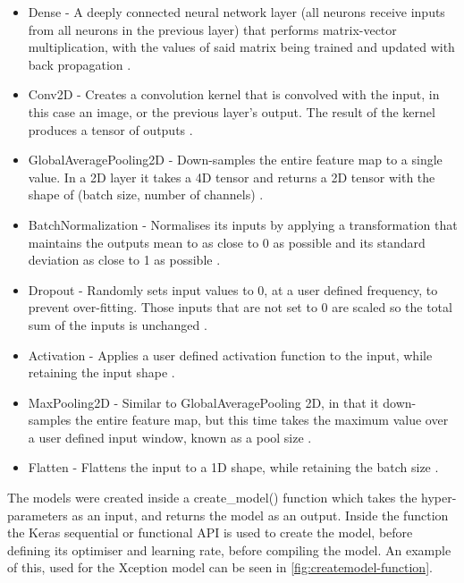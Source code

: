 \begin{itemize}
    \item Dense -  A deeply connected neural network layer (all neurons receive inputs from all neurons in the previous layer) that performs matrix-vector multiplication, with the values of said matrix being trained and updated with back propagation \citep{Denselay11:online}.
    \item Conv2D - Creates a convolution kernel that is convolved with the input, in this case an image, or the previous layer's output. The result of the kernel produces a tensor of outputs \citep{Conv2Dla69:online}.
    \item GlobalAveragePooling2D - Down-samples the entire feature map to a single value. In a 2D layer it takes a 4D tensor and returns a 2D tensor with the shape of (batch size, number of channels) \citep{GlobalAv91:online}.
    \item BatchNormalization - Normalises its inputs by applying a transformation that maintains the outputs mean to as close to 0 as possible and its standard deviation as close to 1 as possible \citep{BatchNor52:online}.
    \item Dropout - Randomly sets input values to 0, at a user defined frequency, to prevent over-fitting. Those inputs that are not set to 0 are scaled so the total sum of the inputs is unchanged \citep{Dropoutl66:online}.
    \item Activation - Applies a user defined activation function to the input, while retaining the input shape \citep{Activati33:online}.
    \item MaxPooling2D - Similar to GlobalAveragePooling 2D, in that it down-samples the entire feature map, but this time takes the maximum value over a user defined input window, known as a pool size \citep{MaxPooli1:online}.
    \item Flatten - Flattens the input to a 1D shape, while retaining the batch size \citep{Flattenl52:online}.
\end{itemize}

The models were created inside a create\_model() function which takes the hyper-parameters as an input, and returns the model as an output. Inside the function the Keras sequential or functional API is used to create the model, before defining its optimiser and learning rate, before compiling the model. An example of this, used for the Xception model can be seen in \autoref{fig:createmodel-function}.

